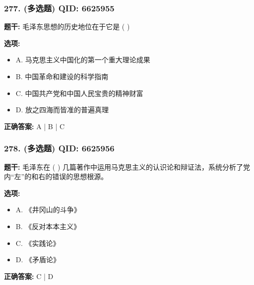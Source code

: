 \documentclass[12pt,UTF8]{ctexart}
\begin{document}
\vspace{0.3em}\hrulefill\vspace{0.7em}

\subsubsection*{277. (多选题) \small QID: 6625955}

\textbf{题干:}
毛泽东思想的历史地位在于它是 ( )

\textbf{选项:}
\begin{itemize}[leftmargin=*]

  \item A. 马克思主义中国化的第一个重大理论成果

  \item B. 中国革命和建设的科学指南

  \item C. 中国共产党和中国人民宝贵的精神财富

  \item D. 放之四海而皆准的普遍真理

\end{itemize}

\textbf{正确答案:}
A | B | C

\vspace{0.3em}\hrulefill\vspace{0.7em}

\subsubsection*{278. (多选题) \small QID: 6625956}

\textbf{题干:}
毛泽东在 ( ) 几篇著作中运用马克思主义的认识论和辩证法，系统分析了党内“左”的和右的错误的思想根源。

\textbf{选项:}
\begin{itemize}[leftmargin=*]

  \item A. 《井冈山的斗争》

  \item B. 《反对本本主义》

  \item C. 《实践论》

  \item D. 《矛盾论》

\end{itemize}

\textbf{正确答案:}
C | D

\vspace{0.3em}\hrulefill\vspace{0.7em}
\end{document}
